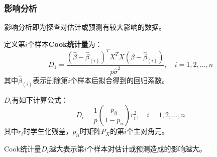 \subsubsection{影响分析}
影响分析即为探查对估计或预测有较大影响的数据。
\begin{definition}
	定义第$i$个样本\textbf{Cook统计量}为：
	\begin{equation*}
		D_1=\frac{(\hat{\beta}-\hat{\beta}_{(i)})^TX^TX(\hat{\beta}-\hat{\beta}_{(i)})}{p\hat{\sigma}^2},\quad i=1,2,\dots,n
	\end{equation*}
	其中$\hat{\beta}_{(i)}$表示删除第$i$个样本后拟合得到的回归系数。
\end{definition}
\begin{theorem}
	$D_i$有如下计算公式：
	\begin{equation*}
		D_i=\frac{1}{p}\left(\frac{p_{ii}}{1-p_{ii}}\right)r_i^2,\quad i=1,2,\dots,n
	\end{equation*}
	其中$r_i$时学生化残差，$p_{ii}$时矩阵$P_X$的第$i$个主对角元。
\end{theorem}
\begin{note}
	Cook统计量$D_i$越大表示第$i$个样本对估计或预测造成的影响越大。
\end{note}